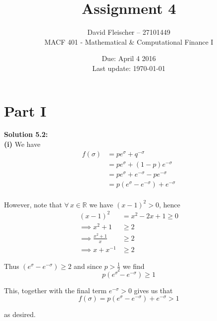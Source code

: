 \documentclass[12pt]{article}
\newcommand{\R}{\mathbb R}
\begin{document}
 
 
\title{Assignment 4}
\author{David Fleischer -- 27101449\\ 
MACF 401 - Mathematical \& Computational Finance I}
\date{Due: April 4 2016 \\ Last update: \today{}}
\maketitle

\section*{Part I}

{\bf Solution 5.2:} \\

{\bf (i)} We have
\begin{align*}
	f(\sigma) &= pe^\sigma + q^{-\sigma} \\
	&= pe^\sigma + (1 - p)e^{-\sigma} \\
	&= pe^\sigma + e^{-\sigma} - pe^{-\sigma} \\
	&= p \left( e^\sigma - e^{-\sigma} \right) + e^{-\sigma} \\
\end{align*}

However, note that $\forall\,x \in \R$ we have $(x - 1)^2 > 0$, hence
\begin{align*}
	(x - 1)^2 &= x^2 - 2x + 1 \geq 0 \\
	\implies x^2 + 1 &\geq 2 \\
	\implies \frac{ x^2 + 1 }{ x } &\geq 2 \\
	\implies x + x^{-1} &\geq 2
\end{align*}

Thus $(e^\sigma - e^{-\sigma}) \geq 2$ and since $p > \frac{1}{2}$ we find
\begin{equation*}
	p \left( e^\sigma - e^{-\sigma} \right) \geq 1
\end{equation*}

This, together with the final term $e^{-\sigma} > 0$ gives us that
\begin{equation*}
	f(\sigma) = p \left( e^\sigma - e^{-\sigma} \right) + e^{-\sigma} > 1
\end{equation*}

as desired.
\end{document}

